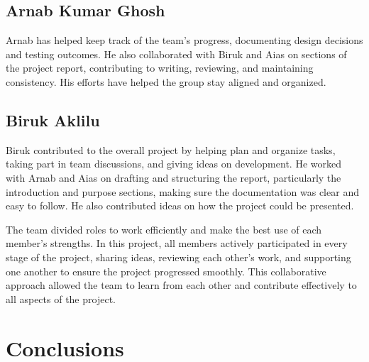 \documentclass[11pt,titlepage,openright]{book}
\begin{document}
\section{Arnab Kumar Ghosh}
Arnab has helped keep track of the team’s progress, documenting design decisions and testing outcomes. He also collaborated with Biruk and Aias on sections of the project report, contributing to writing, reviewing, and maintaining consistency. His efforts have helped the group stay aligned and organized.


\section{Biruk Aklilu}
Biruk contributed to the overall project by helping plan and organize tasks, taking part in team discussions, and giving ideas on development. He worked with Arnab and Aias on drafting and structuring the report, particularly the introduction and purpose sections, making sure the documentation was clear and easy to follow. He also contributed ideas on how the project could be presented.

 \vspace{3ex}The team divided roles to work efficiently and make the best use of each member’s strengths. In this project, all members actively participated in every stage of the project, sharing ideas, reviewing each other’s work, and supporting one another to ensure the project progressed smoothly. This collaborative approach allowed the team to learn from each other and contribute effectively to all aspects of the project.


\chapter{Conclusions}




\end{document}
